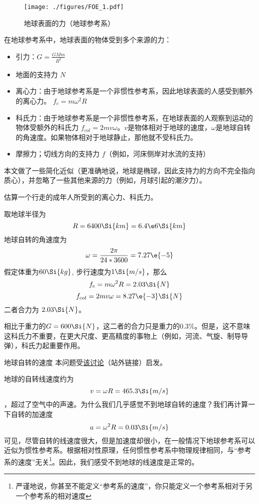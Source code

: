 
\begin{issues}
\issueDraft
{}
\end{issues}

\begin{figure}[ht]
\centering
\texttt{[image: ./figures/FOE\_1.pdf]}
\caption{地球表面的力（地球参考系）} \label{FOE_fig1}
\end{figure}

在地球参考系中，地球表面的物体受到多个来源的力：
\begin{itemize}
\item 引力：$G=\frac{GMm}{R^2}$
\item 地面的支持力 $N$
\item 离心力：由于地球参考系是一个非惯性参考系，因此地球表面的人感受到额外的离心力。 $f_c = m \omega^2 R$
\item 科氏力：由于地球参考系是一个非惯性参考系，在地球表面的人观察到运动的物体受额外的科氏力 $f_{col} = 2 m v \omega$。$v$是物体相对于地球的速度，$\omega$是地球自转的角速度。如果物体相对于地球静止，那他就不受科氏力。
\item 摩擦力；切线方向的支持力 $f$（例如，河床侧岸对水流的支持）
\end{itemize}

本文做了一些简化近似（更准确地说，地球是椭球，因此支持力的方向不完全指向质心），并忽略了一些其他来源的力（例如，月球引起的潮汐力）。

\begin{example}{}
估算一个行走的成年人所受到的离心力、科氏力。

取地球半径为
$$R=6400\Si{km}=6.4\e6 \Si{km}$$
地球自转的角速度为
$$\omega = \frac{2\pi}{24*3600}=7.27\e{-5}$$
假定体重为$60 \Si{kg}$, 步行速度为$1 \Si{m/s}$，那么
$$
f_c = m \omega^2 R = 2.03 \Si{N}
$$
$$
f_{col} = 2 m v\omega = 8.27\e{-3} \Si{N}
$$
二者合力为 $2.03 \Si{N}$。

相比于重力的$G=600 \Si{N}$，这二者的合力只是重力的$0.3\%$。但是，这不意味这科氏力不重要，在更大尺度、更高精度的事物上（例如，河流、气旋、制导导弹），科氏力起重要作用。
\end{example}

\begin{example}{地球自转的速度}
本问题受\href{https://www.zhihu.com/question/579214803}{该讨论}（站外链接）启发。

地球的自转线速度约为 $$v=\omega R = 465.3 \Si{m/s}$$，超过了空气中的声速。为什么我们几乎感觉不到地球自转的速度？我们再计算一下自转的加速度
$$a=\omega^2 R= 0.03 \Si{m/s}$$
可见，尽管自转的线速度很大，但是加速度却很小，在一般情况下地球参考系可以近似为惯性参考系。根据相对性原理，任何惯性参考系中物理规律相同，与“参考系的速度”无关\footnote{严谨地说，你甚至不能定义“参考系的速度”，你只能定义一个参考系相对于另一个参考系的相对速度}。因此，我们感受不到地球的线速度是正常的。
\end{example}
